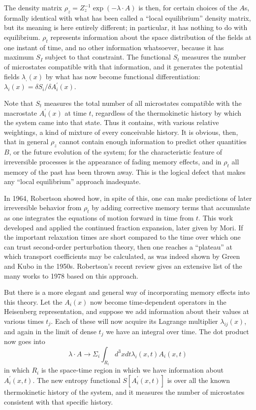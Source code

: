 \documentclass{article}
\begin{document}
The density matrix $\rho_z=Z_z^{-1} \exp (-\lambda \cdot A)$ is then, for certain choices of the $A$s, formally identical with what has been called a ``local equilibrium'' density matrix, but its meaning is here entirely different; in particular, it has nothing to do with equilibrium. $\rho_t$ represents information about the space distribution of the fields at one instant of time, and no other information whatsoever, because it has maximum $S_I$ subject to that constraint. The functional $S_t$ measures the number of microstates compatible with that information, and it generates the potential fields $\lambda_{,}(x)$ by what has now become functional differentiation: $\lambda_i(x)=\delta S_i / \delta A_i^{\prime}(x)$.

Note that $S_t$ measures the total number of all microstates compatible with the macrostate $A_i^{\prime}(x)$ at time $t$, regardless of the thermokinetic history by which the system came into that state. Thus it contains, with various relative weightings, a kind of mixture of every conceivable history. It is obvious, then, that in general $\rho_z$ cannot contain enough information to predict other quantities $B$, or the future evolution of the system; for the characteristic feature of irreversible processes is the appearance of fading memory effects, and in $\rho_t$ all memory of the past has been thrown away. This is the logical defect that makes any ``local equilibrium'' approach inadequate.

In 1964, Robertson \cite{robertson1964} showed how, in spite of this, one can make predictions of later irreversible behavior from $\rho_t$ by adding corrective memory terms that accumulate as one integrates the equations of motion forward in time from $t$. This work developed and applied the continued fraction expansion, later given by Mori. If the important relaxation times are short compared to the time over which one can trust second-order perturbation theory, then one reaches a ``plateau'' at which transport coefficients may be calculated, as was indeed shown by Green and Kubo in the 1950s. Robertson's recent review \cite{robertson1978} gives an extensive list of the many works to 1978 based on this approach.

But there is a more elegant and general way of incorporating memory effects into this theory. Let the $A_i(x)$ now become time-dependent operators in the Heisenberg representation, and suppose we add information about their values at various times $t_j$. Each of these will now acquire its Lagrange multiplier $\lambda_{i j}(x)$, and again in the limit of dense $t_j$ we have an integral over time. The dot product now goes into
\begin{equation}
\lambda \cdot A \rightarrow \Sigma_i \int_{R_i} d^3 x d t \lambda_i(x, t) A_i(x, t) \label{eq-new-ensemble}
\end{equation}
in which $R_i$ is the space-time region in which we have information about $A_i^{\prime}(x, t)$. The new entropy functional $S\left[A_i^{\prime}(x, t)\right]$ is over all the known thermokinetic history of the system, and it measures the number of microstates consistent with that specific history.
\end{document}
